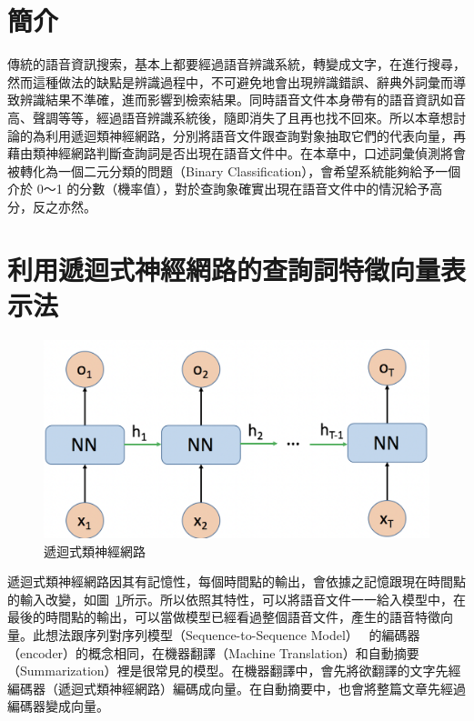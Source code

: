 \section{簡介}
傳統的語音資訊搜索，基本上都要經過語音辨識系統，轉變成文字，在進行搜尋，然而這種做法的缺點是辨識過程中，不可避免地會出現辨識錯誤、辭典外詞彙而導致辨識結果不準確，進而影響到檢索結果。同時語音文件本身帶有的語音資訊如音高、聲調等等，經過語音辨識系統後，隨即消失了且再也找不回來。所以本章想討論的為利用遞迴類神經網路，分別將語音文件跟查詢對象抽取它們的代表向量，再藉由類神經網路判斷查詢詞是否出現在語音文件中。在本章中，口述詞彙偵測將會被轉化為一個二元分類的問題（Binary
Classification），會希望系統能夠給予一個介於 0～1 的分數（機率值），對於查詢象確實出現在語音文件中的情況給予高分，反之亦然。


\section{利用遞迴式神經網路的查詢詞特徵向量表示法}
\begin{figure}[h]
\centering
\includegraphics[scale=0.4]{images/ch3_RNN.png} 
\caption{遞迴式類神經網路}
\label{ch3_RNN}
\end{figure}
遞迴式類神經網路因其有記憶性，每個時間點的輸出，會依據之記憶跟現在時間點的輸入改變，如圖~\ref{ch3_RNN}所示。所以依照其特性，可以將語音文件一一給入模型中，在最後的時間點的輸出，可以當做模型已經看過整個語音文件，產生的語音特徵向量。此想法跟序列對序列模型（Sequence-to-Sequence
Model）~\cite{sutskever2014sequence} 的編碼器（encoder）的概念相同，在機器翻譯（Machine
Translation）和自動摘要（Summarization）裡是很常見的模型。在機器翻譯中，會先將欲翻譯的文字先經編碼器（遞迴式類神經網路）編碼成向量。在自動摘要中，也會將整篇文章先經過編碼器變成向量。

